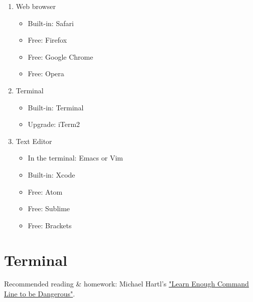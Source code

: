 \documentclass{42-en}
\begin{document}
\begin{enumerate}
	\item Web browser
	\begin{itemize}
		\item Built-in: Safari
		\item Free: Firefox
		\item Free: Google Chrome
		\item Free: Opera
	\end{itemize}
	\item Terminal
	\begin{itemize}
		\item Built-in: Terminal
		\item Upgrade: iTerm2
	\end{itemize}
	\item Text Editor
	\begin{itemize}
		\item In the terminal: Emacs or Vim
		\item Built-in: Xcode
		\item Free: Atom
		\item Free: Sublime
		\item Free: Brackets
	\end{itemize}
\end{enumerate}



\chapter{Terminal}

Recommended reading \& homework: Michael Hartl's \href{https://www.learnenough.com/command-line-tutorial}{"Learn Enough Command Line to be Dangerous"}.
\end{document}
